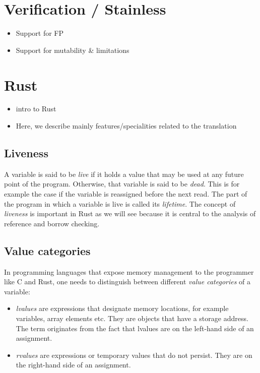 \section{Verification / Stainless}

\begin{itemize}
\tightlist
\item
  Support for FP
\item
  Support for mutability \& limitations
\end{itemize}

\section{Rust}

\begin{itemize}
\tightlist
\item
  intro to Rust
\item
  Here, we describe mainly features/specialities related to the
  translation
\end{itemize}


\subsection{Liveness}

A variable is said to be \emph{live} if it holds a value that may be
used at any future point of the program.\cite{wiki:live-vars}
Otherwise, that variable is said to be \emph{dead}. This is for example
the case if the variable is reassigned before the next read. The part of
the program in which a variable is live is called its \emph{lifetime}.
The concept of \emph{liveness} is important in Rust as we will see
because it is central to the analysis of reference and borrow checking.

\subsection{Value categories}

In programming languages that expose memory management to the programmer
like C and Rust, one needs to distinguish between different \emph{value
categories} of a variable: \cite{wiki:lvalues}

\begin{itemize}
\tightlist
\item
  \emph{lvalues} are expressions that designate memory locations, for
  example variables, array elements etc. They are objects that have a
  storage address. The term originates from the fact that lvalues are on
  the left-hand side of an assignment.
\item
  \emph{rvalues} are expressions or temporary values that do not
  persist. They are on the right-hand side of an assignment.
\end{itemize}


